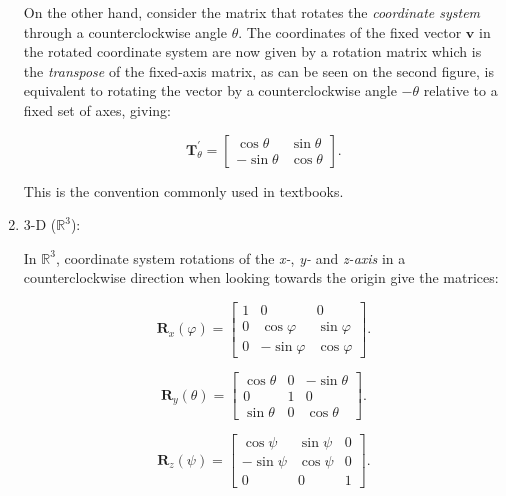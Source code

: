 \begin{enumerate}
        On the other hand, consider the matrix that rotates the
        \textit{coordinate system} through a counterclockwise angle $\theta$.
        The coordinates of the fixed vector $\mathbf{v}$ in the rotated
        coordinate system are now given by a rotation matrix which is the
        \textit{transpose} of the fixed-axis matrix, as can be seen on the
        second figure, is equivalent to rotating the vector by
        a counterclockwise angle $-\theta$ relative to a fixed set of axes,
        giving:

        \begin{equation}
            \mathbf{T}_{\theta}^{'} = \begin{bmatrix}
                \cos \theta & \sin \theta \\
                -\sin \theta & \cos \theta
            \end{bmatrix}
        .\end{equation}

        This is the convention commonly used in textbooks.

    \item 3-D ($\mathbb{R}^{3}$):

        In $\mathbb{R}^{3}$, coordinate system rotations of the
        \textit{x-}, \textit{y-} and \textit{z-axis} in a counterclockwise
        direction when looking towards the origin give the matrices:

        \begin{equation}
            \mathbf{R}_{x}(\varphi) =
            \begin{bmatrix}
                1 & 0 & 0 \\
                0 & \cos \varphi & \sin \varphi \\
                0 & -\sin \varphi & \cos \varphi
            \end{bmatrix}
        .\end{equation}

        \begin{equation}
            \mathbf{R}_{y}(\theta) =
            \begin{bmatrix}
                \cos \theta & 0 & -\sin \theta \\
                0 & 1 & 0 \\
                \sin \theta & 0 & \cos \theta
            \end{bmatrix}
        .\end{equation}

        \begin{equation}
            \mathbf{R}_{z}(\psi) =
            \begin{bmatrix}
                \cos \psi & \sin \psi & 0 \\
                -\sin \psi & \cos \psi & 0 \\
                0 & 0 & 1
            \end{bmatrix}
        .\end{equation}


\end{enumerate}
